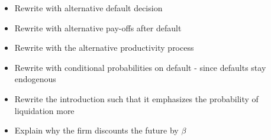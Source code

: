 \documentclass[12pt]{article}
\begin{document}
\begin{itemize}
    \item Rewrite with alternative default decision  \checkmark
    \item Rewrite with alternative pay-offs after default  \checkmark
    \item Rewrite with the alternative productivity process  \checkmark
    \item Rewrite with conditional probabilities on default - since defaults stay endogenous  \checkmark
    \item Rewrite the introduction  such that it emphasizes the probability of liquidation more
    \item Explain why the firm discounts the future by $\beta$ \checkmark

\end{itemize} \normalsize
\end{document}
